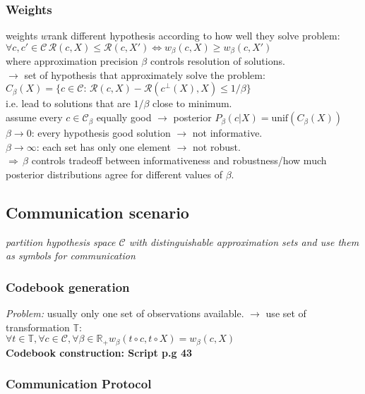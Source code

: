 \documentclass[9pt,parskip]{scrartcl}
\begin{document}
\begin{multicols*}{4}
\subsubsection*{Weights}
weights $w$rank different hypothesis according to how well they solve problem: \\
$\forall c, c' \in \mathcal{C} \, \mathcal{R}(c,X) \leq \mathcal{R}(c,X') \Leftrightarrow w_{\beta}(c,X) \geq w_{\beta}(c,X')$ \\
where approximation precision $\beta$ controls resolution of solutions. \\
$\to$ set of hypothesis that approximately solve the problem: \\$C_{\beta}(X)= \{c \in \mathcal{C} : \, \mathcal{R} (c,X) - \mathcal{R}(c^{\bot}(X),X) \leq 1/\beta \}$ \\
i.e. lead to solutions that are $1/\beta$ close to minimum. \\
assume every $c \in \mathcal{C}_{\beta}$ equally good $\to$ posterior $P_{\beta}(c|X) = \text{unif}(C_{\beta}(X))$ \\
$\beta \to 0$: every hypothesis good solution $\to$ not informative. \\
$\beta \to \infty$: each set has only one element $\to$ not robust. \\
$ \Rightarrow \, \beta$ controls tradeoff between informativeness and robustness/how much posterior distributions agree for different values of $\beta$.

\subsection*{Communication scenario}
\textit{partition hypothesis space $\mathcal{C}$ with distinguishable approximation sets and use them as symbols for communication}
\subsubsection*{Codebook generation}
\textit{Problem:} usually only one set of observations available. $\to$ use set of transformation $\mathbb{T}$: \\
$\forall t \in \mathbb{T}, \forall c \in \mathcal{C}, \forall{\beta} \in \mathbb{R}_{+} w_{\beta}(t \circ c, t \circ X) = w_{\beta}(c,X)$ \\
\textbf{Codebook construction: Script p.g 43}


\subsubsection*{Communication Protocol}


\end{multicols*}
\end{document}
